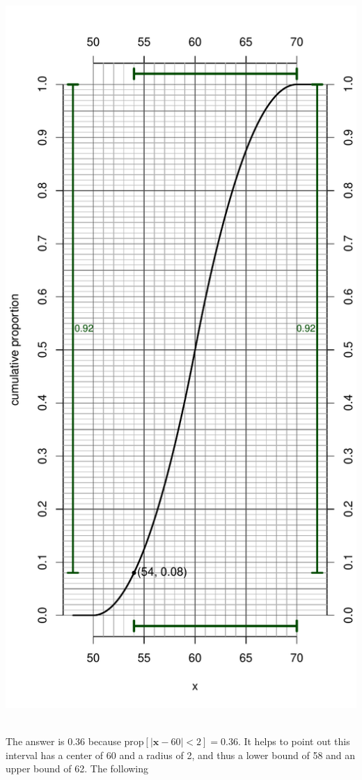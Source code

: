 \begin{solution}
\begin{answerlist}
\includegraphics{unnamed-chunk-10-1.pdf} ~
  \item The answer is 0.36 because \(\text{prop}[|\mathbf{x}-60|<2]=0.36\). It
helps to point out this interval has a center of 60 and a radius of 2,
and thus a lower bound of 58 and an upper bound of 62. The following

\end{answerlist}
\end{solution}
